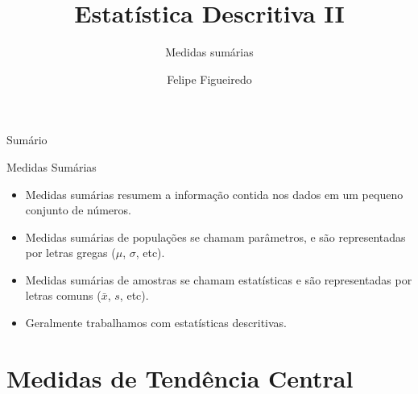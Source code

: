 \documentclass{beamer}
\title%
{Estatística Descritiva II}
\subtitle
{Medidas sumárias} %
\author%
{Felipe Figueiredo}%
\institute[INTO] %
{
Instituto Nacional de Traumatologia e Ortopedia}
\date%
{}
\begin{document}
\begin{frame}
  \titlepage
\end{frame}

\begin{frame}{Sumário}
  \tableofcontents
\end{frame}







\begin{frame}{Medidas Sumárias}
  \begin{itemize}
  \item Medidas sumárias resumem a informação contida nos dados em um
    pequeno conjunto de números.
  \item Medidas sumárias de \alert{populações} se chamam
    \alert{parâmetros}, e são representadas por letras gregas ($\mu$,
    $\sigma$, etc).
  \item Medidas sumárias de \alert{amostras} se chamam \alert{estatísticas} e são representadas por letras comuns ($\bar{x}$,
    $s$, etc).
  \item Geralmente trabalhamos com estatísticas descritivas.
  \end{itemize}
\end{frame}

\section{Medidas de Tendência Central}
\end{document}

